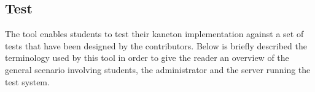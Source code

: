 %
%
%
%
%
%

%
%

\subsection{Test}
\label{section:test}

The  tool enables students to test their kaneton implementation
against a set of tests that have been designed by the contributors. Below
is briefly described the terminology used by this tool in order to give
the reader an overview of the general scenario involving students, the
administrator and the server running the test system.

